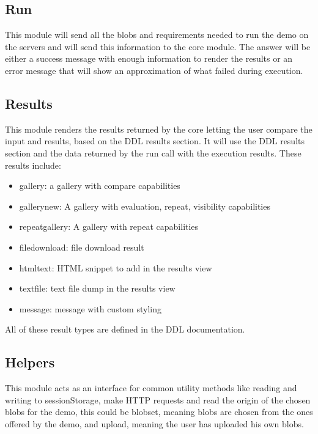 \subsection{Run}
This module will send all the blobs and requirements needed to run the demo on the servers and will send this information to 
the core module. The answer will be either a success message with enough information to render the results or an error message 
that will show an approximation of what failed during execution.

\subsection{Results}
This module renders the results returned by the core letting the user compare the input and results, based on the DDL results section. 
It will use the DDL results section and the data returned by the run call with the execution results. These results include:

\begin{itemize}
	\item gallery: a gallery with compare capabilities
	\item gallery\textunderscore new: A gallery with evaluation, repeat, visibility capabilities
	\item repeat\textunderscore gallery: A gallery with repeat capabilities
	\item file\textunderscore download: file download result
	\item html\textunderscore text: HTML snippet to add in the results view
	\item text\textunderscore file: text file dump in the results view
	\item message: message with custom styling
\end{itemize}

All of these result types are defined in the DDL documentation.


\subsection{Helpers}
This module acts as an interface for common utility methods like reading and writing to sessionStorage, make HTTP requests and 
read the origin of the chosen blobs for the demo, this could be blobset, meaning blobs are chosen from the ones offered by the 
demo, and upload, meaning the user has uploaded his own blobs.

